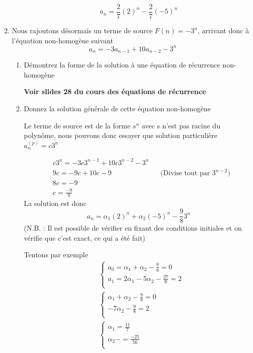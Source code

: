 \documentclass[A4paper,11pt]{article}
\begin{document}
\begin{enumerate}
\begin{enumerate}
        \[
            a_n = \frac{2}{7} (2)^n - \frac{2}{7} (-5)^n
        \]
    \end{enumerate}
    \item Nous rajoutons désormais un terme de source $F(n) = - 3^n$, arrivant donc à l'équation non-homogène suivant
    \[ a_n = -3a_{n-1} + 10a_{n-2} - 3^n\]
    \begin{enumerate}
        \item Démontrez la forme de la solution à une équation de récurrence non-homogène
        
        \textbf{Voir slides 28 du cours des équations de récurrence}
         \item Donnez la solution générale de cette équation non-homogène
         
         Le terme de source est de la forme $s^n$ avec s n'est pas racine du polynôme, nous pouvons donc essayer que solution particulière $a_n^{(p)} = c3^n$
         
         \begin{align*}
             &c3^n = -3c3^{n-1} + 10c3^{n-2} -3^n\\
             & 9c = -9c + 10c - 9 &&\text{(Divise tout par }3^{n-2})\\
             & 8c = -9\\
             & c = \frac{-9}{8}
         \end{align*}
         La solution est donc \[
         a_n = \alpha_1 (2)^n + \alpha_2 (-5)^n - \frac{9}{8}3^n
         \]
         (N.B. : Il est possible de vérifier en fixant des conditions initiales et on vérifie que c'est exact, ce qui a été fait)
         
         Tentons par exemple 
        \begin{align*}
        &\begin{cases}
            a_0 = \alpha_1 + \alpha_2 - \frac{9}{8}= 0\\
            a_1 = 2\alpha_1 -5 \alpha_2 - \frac{27}{8}= 2\\
        \end{cases}\\
        &\begin{cases}
             \alpha_1 + \alpha_2 - \frac{9}{8}= 0\\
              -7 \alpha_2 - \frac{9}{8}= 2\\
        \end{cases}\\
        &\begin{cases}
             \alpha_1 = \frac{11}{7}\\
              \alpha_2 - = \frac{-25}{56}\\
        \end{cases}\\
        \end{align*}
        

\end{enumerate}
\end{enumerate}
\end{document}

